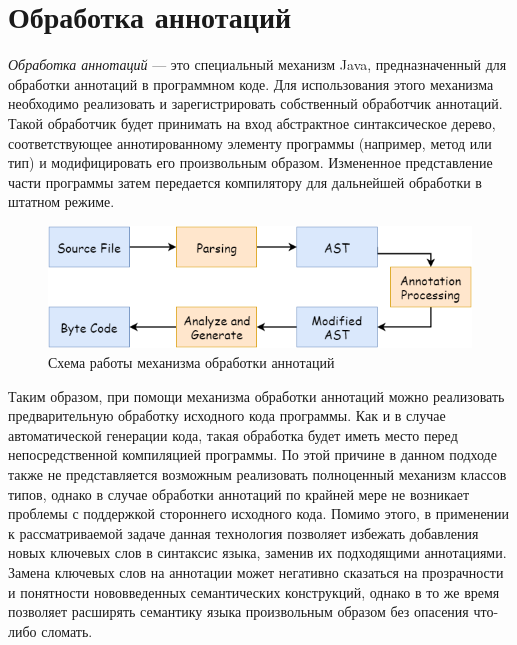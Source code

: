 \section{Обработка аннотаций \label{sct:concept-annotations-processing}}

\emph{Обработка аннотаций} --- это специальный механизм Java, предназначенный для обработки аннотаций в программном коде. Для использования этого механизма необходимо реализовать и зарегистрировать собственный обработчик аннотаций. Такой обработчик будет принимать на вход абстрактное синтаксическое дерево, соответствующее аннотированному элементу программы (например, метод или тип) и модифицировать его произвольным образом. Измененное представление части программы затем передается компилятору для дальнейшей обработки в штатном режиме. 

\begin{figure}[htbp]
    \centering
    \includegraphics[width=\textwidth]{resources/05/01_annotation_processing_scheme.png}
    \caption{Схема работы механизма обработки аннотаций}
    \label{fig04:annotation-processing}
\end{figure}

Таким образом, при помощи механизма обработки аннотаций можно реализовать предварительную обработку исходного кода программы. Как и в случае автоматической генерации кода, такая обработка будет иметь место перед непосредственной компиляцией программы. По этой причине в данном подходе также не представляется возможным реализовать полноценный механизм классов типов, однако в случае обработки аннотаций по крайней мере не возникает проблемы с поддержкой стороннего исходного кода. Помимо этого, в применении к рассматриваемой задаче данная технология позволяет избежать добавления новых ключевых слов в синтаксис языка, заменив их подходящими аннотациями. Замена ключевых слов на аннотации может негативно сказаться на прозрачности и понятности нововведенных семантических конструкций, однако в то же время позволяет расширять семантику языка произвольным образом без опасения что-либо сломать.

